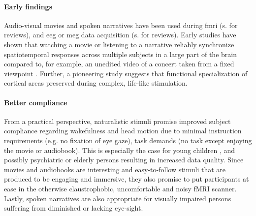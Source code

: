 \paragraph{Early findings}
Audio-visual movies and spoken narratives have been used during \ac{fmri}
(s.\citet{hamilton2018revolution, hasson2008neurocinematics,
sonkusare2019naturalistic, saarimaki2021naturalistic}
for reviews), and \ac{eeg} or \ac{meg} data acquisition (s. \citet{alday2019meg,
kandylaki2019story} for reviews).
%
Early studies have shown that watching a movie \citep{hasson2004intersubject,
hasson2008neurocinematics, hasson2010reliability} or listening to a
narrative \citep{lerner2011topographic, wilson2008beyond} reliably synchronize spatiotemporal responses across multiple subjects
in a large part of the brain compared to, for example, an unedited video of a
concert taken from a fixed viewpoint \citep{hasson2004intersubject,
hasson2008neurocinematics, hasson2010reliability, lerner2011topographic,
wilson2008beyond}.
%
Further, a pioneering study \citep{bartels2004mapping} suggests that functional
specialization of cortical areas preserved during complex, life-like
stimulation.


\paragraph{Better compliance}
%
From a practical perspective, naturalistic stimuli promise improved subject
compliance regarding wakefulness and head motion due to minimal instruction
requirements (e.g. no fixation of eye gaze), task demands (no task except
enjoying the movie or audiobook).
%
This is especially the case for young children \citep{vanderwal2015inscapes},
and possibly psychiatric \citep{eickhoff2020towards} or elderly persons
resulting in increased data quality.
%
Since movies and audiobooks are interesting and easy-to-follow stimuli that are
produced to be engaging and immersive, they also promise to put participants at
ease in the otherwise claustrophobic, uncomfortable and noisy fMRI scanner.
%
Lastly, spoken narratives are also appropriate for visually impaired persons
suffering from diminished or lacking eye-sight.


